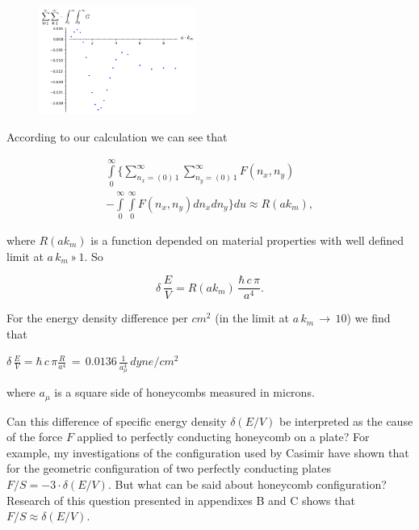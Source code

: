 \documentclass[twoside, 10pt]{article}
\begin{document}
\begin{multicols}{2}
\begin{figure}
\begin{center}
\includegraphics[width=0.46\textwidth]{sum_sum_int_int_G_on_a_km.png}
\caption{}{}
\end{center}
\label{fig:G_on_a_km}
\end{figure}



    According to our calculation we can see that

\vspace{-3.5mm}
\begin{equation}
\begin{array}{l}
    \int\limits_{0}^{\infty} \Bigg\{ \sum\limits_{n_x=\left(0\right)\,1}^{\infty} \sum\limits_{n_y=\left(0\right)\,1}^{\infty} F\left(n_x, n_y\right) \\
- \int\limits_{0}^{\infty} \int\limits_{0}^{\infty} F\left(n_x, n_y\right) d{n_x} d{n_y} \Bigg\} d{u} \approx R\left(a k_m\right),
\end{array}
\end{equation}


    where \(R\left(a k_m\right)\) is a function depended on material
properties with well defined limit at \(a\,k_m\,»\,1\). So

    \begin{equation}
\delta\,\frac{E}{V} = R\left(a k_m\right)\,\frac{\hbar\,c\,\pi}{a^4}.
\end{equation}

    For the energy density difference per \(cm^2\) (in the limit at
\(a\,k_m\,\rightarrow \,10\)) we find that

    \(\delta\,\frac{E}{V} = \hbar\,c\, \pi\frac{R}{a^4}\,=\,0.0136\,\frac{1}{a_{\mu}^4}\,dyne/cm^2\)

    where \(a_{\mu}\) is a square side of honeycombs measured in microns.


    Can this difference of specific energy density
\(\delta\left(E/V\right)\) be interpreted as the cause of the force
\(F\) applied to perfectly conducting honeycomb on a plate? For example,
my investigations of the configuration used by Casimir have shown that for the
geometric configuration of two perfectly conducting plates
\(F/S = -3 \cdot \delta\left(E/V\right)\). But what can be said about honeycomb
configuration? Research of this question presented in appendixes B and C
shows that \(F/S \approx \delta\left(E/V\right)\).


\end{multicols}
\end{document}
